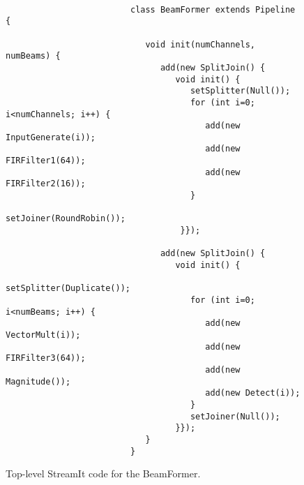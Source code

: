 \begin{figure}
  \begin{center}  \\
    \hspace{0.3in}  \vspace{-6pt} \caption{Execution traces for the (a)
    original (on 64 tiles) and (b) load-balanced (on 16 tiles)
    partitionings of the BeamFormer.  Graphs are shaded as in
    Figure~\ref{fig:fm-blood}. \protect\label{fig:beam-blood}}
\end{center}
\vspace{24pt}
\small
\begin{verbatim}
                         class BeamFormer extends Pipeline {
                         
                            void init(numChannels, numBeams) {
                               add(new SplitJoin() { 
                                  void init() {
                                     setSplitter(Null());
                                     for (int i=0; i<numChannels; i++) {
                                        add(new InputGenerate(i));
                                        add(new FIRFilter1(64));
                                        add(new FIRFilter2(16));
                                     }
                                     setJoiner(RoundRobin());   
                                   }});
                            
                               add(new SplitJoin() {
                                  void init() {
                                     setSplitter(Duplicate());
                                     for (int i=0; i<numBeams; i++) {
                                        add(new VectorMult(i));
                                        add(new FIRFilter3(64));
                                        add(new Magnitude());
                                        add(new Detect(i));
                                     }
                                     setJoiner(Null());
                                  }});
                            }
                         }
\end{verbatim}
\caption{\protect\small Top-level StreamIt code for the BeamFormer.\protect\label{fig:beamcode}}
\end{figure}

